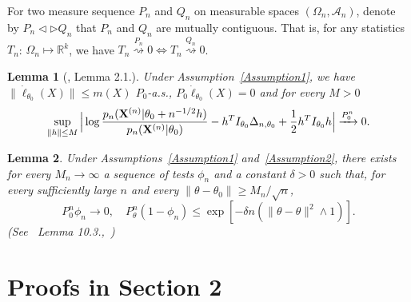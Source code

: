 \documentclass[3p]{elsarticle}
\theoremstyle{plain}
\newtheorem{lemma}{\quad\quad Lemma}
\theoremstyle{definition}
\theoremstyle{remark}
\begin{document}
\begin{appendices}
For two measure sequence $P_n$ and $Q_n$ on measurable spaces $(\Omega_n,\mathcal{A}_n)$, denote by $P_n\triangleleft \triangleright Q_n$ that $P_n$ and $Q_n$ are mutually contiguous. That is, for any statistics $T_n$: $\Omega_n\mapsto \mathbb{R}^k$, we have $T_n\overset{P_n}{\rightsquigarrow}0\Leftrightarrow T_n\overset{Q_n}{\rightsquigarrow}0$.

\begin{lemma}[\cite{Kleijn2012The}, Lemma 2.1.]\label{Thm:localExpansion}
    Under Assumption~\ref{Assumption1},
    we have $\|\dot{\ell}_{\theta_0}(X)\|\leq m(X)$ $P_0$-a.s., $P_0 \dot{\ell}_{\theta_0}(X)=0$ and for every $M>0$
    \begin{equation*}
        \sup_{\|h\|\leq M}\Big|
         \log \frac{p_n(\mathbf{X}^{(n)}|\theta_0+n^{-1/2}h)}{p_n(\mathbf{X}^{(n)}|\theta_0)}-h^T I_{\theta_0}\Delta_{n,\theta_0}+\frac{1}{2}h^T I_{\theta_0}h
        \Big|\xrightarrow{P^n_0}0.
    \end{equation*}
\end{lemma}

\begin{lemma}\label{Thm:someTest}
    Under Assumptions~\ref{Assumption1} and~\ref{Assumption2},
    there exists for every $M_n\to \infty$ a sequence of tests $\phi_n$ and a constant $\delta>0$ such that, for every sufficiently large $n$ and every $\|\theta-\theta_0\|\geq M_n/\sqrt{n}$,
    $$
    P^n_{0} \phi_n\to 0,\quad
    P^n_{\theta} (1-\phi_n)\leq \exp[-\delta n(\|\theta-\theta\|^2\wedge 1)].
    $$
    (See~\cite{van2000asymptotic} Lemma 10.3.,~\cite{Kleijn2012The})
\end{lemma}
    \section{Proofs in Section 2}


\end{appendices}
\end{document}
